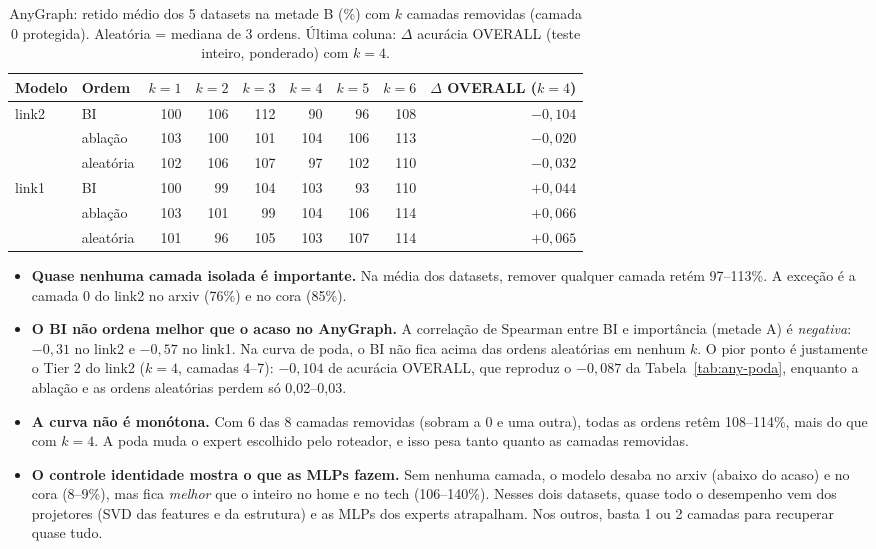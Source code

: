 \documentclass[12pt,a4paper]{article}
\newcommand{\ruim}[1]{\textcolor{red!70!black}{#1}}
\begin{document}
\begin{table}[H]
\centering
\caption{AnyGraph: retido médio dos 5 datasets na metade B (\%) com $k$ camadas removidas (camada 0 protegida). Aleatória = mediana de 3 ordens. Última coluna: $\Delta$ acurácia OVERALL (teste inteiro, ponderado) com $k=4$.}
\label{tab:any-curvas}
\begin{tabular}{@{}llrrrrrr|r@{}}
\toprule
Modelo & Ordem & $k=1$ & $k=2$ & $k=3$ & $k=4$ & $k=5$ & $k=6$ & $\Delta$ OVERALL ($k=4$) \\
\midrule
\multirow{3}{*}{link2} & BI       & 100 & 106 & 112 & \ruim{90} & 96 & 108 & \ruim{$-0{,}104$} \\
 & ablação   & 103 & 100 & 101 & 104 & 106 & 113 & $-0{,}020$ \\
 & aleatória & 102 & 106 & 107 & 97 & 102 & 110 & $-0{,}032$ \\
\midrule
\multirow{3}{*}{link1} & BI       & 100 & 99 & 104 & 103 & 93 & 110 & $+0{,}044$ \\
 & ablação   & 103 & 101 & 99 & 104 & 106 & 114 & $+0{,}066$ \\
 & aleatória & 101 & 96 & 105 & 103 & 107 & 114 & $+0{,}065$ \\
\bottomrule
\end{tabular}
\end{table}

\begin{itemize}
  \item \textbf{Quase nenhuma camada isolada é importante.} Na média dos datasets, remover qualquer camada retém 97--113\%. A exceção é a camada 0 do link2 no arxiv (76\%) e no cora (85\%).
  \item \textbf{O BI não ordena melhor que o acaso no AnyGraph.} A correlação de Spearman entre BI e importância (metade A) é \emph{negativa}: $-0{,}31$ no link2 e $-0{,}57$ no link1. Na curva de poda, o BI não fica acima das ordens aleatórias em nenhum $k$. O pior ponto é justamente o Tier 2 do link2 ($k=4$, camadas 4--7): $-0{,}104$ de acurácia OVERALL, que reproduz o $-0{,}087$ da Tabela~\ref{tab:any-poda}, enquanto a ablação e as ordens aleatórias perdem só 0,02--0,03.
  \item \textbf{A curva não é monótona.} Com 6 das 8 camadas removidas (sobram a 0 e uma outra), todas as ordens retêm 108--114\%, mais do que com $k=4$. A poda muda o expert escolhido pelo roteador, e isso pesa tanto quanto as camadas removidas.
  \item \textbf{O controle identidade mostra o que as MLPs fazem.} Sem nenhuma camada, o modelo desaba no arxiv (abaixo do acaso) e no cora (8--9\%), mas fica \emph{melhor} que o inteiro no home e no tech (106--140\%). Nesses dois datasets, quase todo o desempenho vem dos projetores (SVD das features e da estrutura) e as MLPs dos experts atrapalham. Nos outros, basta 1 ou 2 camadas para recuperar quase tudo.
\end{itemize}
\end{document}
